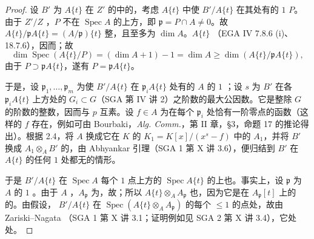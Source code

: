 \begin{proof}
设 $B'$ 为 $A\{t\}$ 在 $Z'$ 的中的，考虑 $A\{t\}$ 中使 $B'/A\{t\}$ 在其处有的 $1$  $P$。由于 $Z'/Z$ ，$P$ 不在 $\operatorname{Spec}A$ 的上方，即 $\mathfrak p=P\cap A\ne0$。故 $A\{t\}/\mathfrak p A\{t\}=(A/\mathfrak p)\{t\}$ 整，且至多为 $\dim A$。$A\{t\}$ （EGA IV 7.8.6 (i)、18.7.6），因而；故
\[\dim\operatorname{Spec}(A\{t\}/P)=(\dim A+1)-1=\dim A\geq\dim(A\{t\}/\mathfrak p A\{t\}),\]
由于 $P\supset\mathfrak p A\{t\}$，遂有 $P=\mathfrak p A\{t\}$。

于是，设 $\mathfrak p_1,\ldots,\mathfrak p_m$ 为使 $B'/A\{t\}$ 在 $\mathfrak p_iA\{t\}$ 处有的 $A$ 的 $1$ ；设 $s$ 为 $B'$ 在各 $\mathfrak p_iA\{t\}$ 上方处的 $G_i\subset G$（SGA 第 IV 讲 2）之阶数的最大公因数。它是整除 $G$ 的阶数的整数，因而与 $p$ 互素。设 $f\in A$ 为在每个 $\mathfrak p_i$ 处恰有一阶零点的函数（这样的 $f$ 存在，例如可由 Bourbaki，\textit{Alg. Comm.}，第 II 章，\S3，命题 17 的推论得出）。根据 2.4，将 $A$ 换成它在 $K$ 的 $K_1=K[x]/(x^s-f)$ 中的 $A_1$，并将 $B'$ 换成 $A_1\otimes_A B'$ 的，由 Abhyankar 引理（SGA 1 第 X 讲 3.6），便归结到 $B'$ 在 $A\{t\}$ 的任何 $1$ 处都无的情形。

于是 $B'/A\{t\}$ 在 $\operatorname{Spec}A$ 每个 $1$ 点上方的 $\operatorname{Spec}A\{t\}$ 的上也。事实上，设 $\mathfrak p$ 为 $A$ 的 $1$ 。由于 $A$ ，$A_{\mathfrak p}$ 为，故；所以 $A\{t\}\otimes_A A_{\mathfrak p}$ 也，因为它是在 $A_{\mathfrak p}[t]$ 上的的。由假设， $B'/A\{t\}$ 在 $\operatorname{Spec}(A\{t\}\otimes_A A_{\mathfrak p})$ 的每个 $\leq1$ 的点处，故由 Zariski--Nagata （SGA 1 第 X 讲 3.1；证明例如见 SGA 2 第 X 讲 3.4），它处处。


\end{proof}
